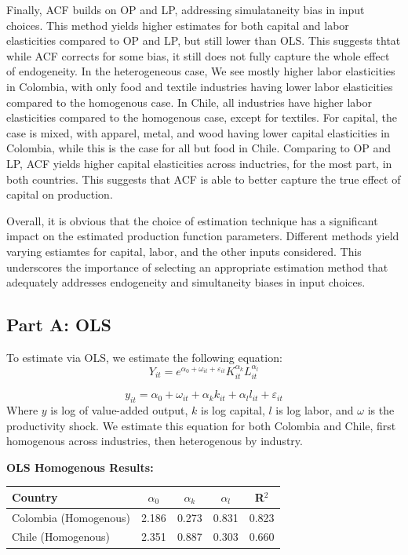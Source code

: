 \documentclass{article}
\begin{document}
Finally, ACF builds on OP and LP, addressing simulataneity bias in input choices. This method yields higher estimates for both capital and labor elasticities compared to OP and LP, but still lower than OLS.
This suggests thtat while ACF corrects for some bias, it still does not fully capture the whole effect of endogeneity. In the heterogeneous case, We see mostly higher labor elasticities in Colombia, with only
food and textile industries having lower labor elasticities compared to the homogenous case. In Chile, all industries have higher labor elasticities compared to the homogenous case, except for textiles. For capital,
the case is mixed, with apparel, metal, and wood having lower capital elasticities in Colombia, while this is the case for all but food in Chile. Comparing to OP and LP, ACF yields higher capital elasticities across
inductries, for the most part, in both countries. This suggests that ACF is able to better capture the true effect of capital on production.

Overall, it is obvious that the choice of estimation technique has a significant impact on the estimated production function parameters. Different methods yield varying estiamtes for capital, labor, and the other
inputs considered. This underscores the importance of selecting an appropriate estimation method that adequately addresses endogeneity and simultaneity biases in input choices.

\subsection*{Part A: OLS}

To estimate via OLS, we estimate the following equation:
\begin{equation}
  Y_{it} = e^{\alpha_0 + \omega_{it} + \varepsilon_{it}} K_{it}^{\alpha_k} L_{it}^{\alpha_l}
\end{equation}

\begin{equation}
  y_{it} = \alpha_0 + \omega_{it} + \alpha_k k_{it} + \alpha_l l_{it} + \varepsilon_{it}
\end{equation}
Where $y$ is log of value-added output, $k$ is log capital, $l$ is log labor, and $\omega$ is the productivity shock. We estimate this equation for both Colombia and Chile,
first homogenous across industries, then heterogenous by industry.

\textbf{OLS Homogenous Results:}

\begin{center}
\begin{tabular}[h]{|lcccc|}
  \hline
  \textbf{Country} & \textbf{$\alpha_0$} & \textbf{$\alpha_k$} & \textbf{$\alpha_l$} & \textbf{R$^2$} \\
  \hline
  Colombia (Homogenous) & 2.186 & 0.273 & 0.831 & 0.823 \\
  Chile (Homogenous) & 2.351 & 0.887 & 0.303 & 0.660 \\
  \hline
\end{tabular}
\end{center}
\end{document}
